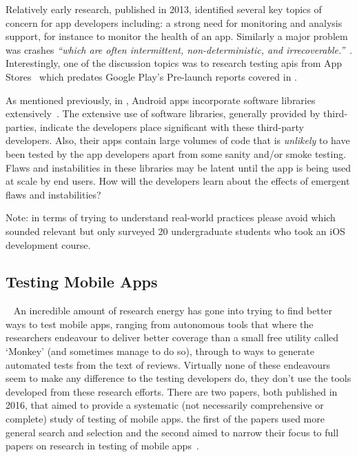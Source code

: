 Relatively early research, published in 2013, identified several key topics of concern for app developers including: a strong need for monitoring and analysis support, for instance to monitor the health of an app. Similarly a major problem was crashes \emph{``which are often intermittent, non-deterministic, and irrecoverable.''}~. Interestingly, one of the discussion topics was to research testing \acrshort{api}s from App Stores~ which predates Google Play's Pre-launch reports covered in .


As mentioned previously, in , Android apps incorporate software libraries extensively~. The extensive use of software libraries, generally provided by third-parties, indicate the developers place significant  with these third-party developers. Also, their apps contain large volumes of code that is \emph{unlikely} to have been tested by the app developers apart from some sanity and/or smoke testing. Flaws and instabilities in these libraries may be latent until the app is being used at scale by end users. How will the developers learn about the effects of emergent flaws and instabilities?

Note: in terms of trying to understand real-world practices please avoid \textcite{santos2016_investigating_the_adoption_of_agile_practices_by_20_undergrad_students_in_mobile_app_devt} which sounded relevant but only surveyed 20 undergraduate students who took an iOS development course. 


\subsection{Testing Mobile Apps}~\label{rw-testing-mobile-apps-topic}
An incredible amount of research energy has gone into trying to find better ways to test mobile apps, ranging from autonomous tools that where the researchers endeavour to deliver better coverage than a small free utility called `Monkey' (and sometimes manage to do so), through to ways to generate automated tests from the text of reviews. Virtually none of these endeavours seem to make any difference to the testing developers do, they don't use the tools developed from these research efforts. There are two papers, both published in 2016, that aimed to provide a systematic (not necessarily comprehensive or complete) study of testing of mobile apps. the first of the papers used more general search and selection   and the second aimed to narrow their focus to full papers on research in testing of mobile apps~. 

